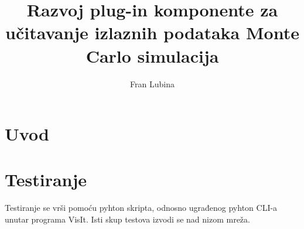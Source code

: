 \documentclass[times, utf8, zavrsni]{fer}
\begin{document}

\title{Razvoj plug-in komponente za učitavanje izlaznih podataka Monte Carlo simulacija}


\author{Fran Lubina}

\maketitle

\izvornik


\tableofcontents

\chapter{Uvod}

\chapter{Testiranje}
Testiranje se vrši pomoću pyhton skripta, odnosno ugrađenog pyhton CLI-a unutar programa VisIt.
Isti skup testova izvodi se nad nizom mreža.
	
\end{document}
